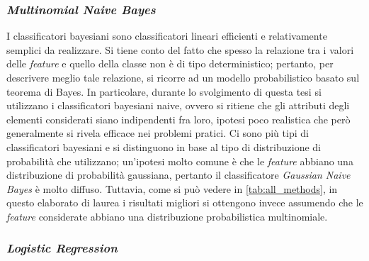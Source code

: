 \documentclass[12pt,a4paper,oneside]{article}
\begin{document}
\subsubsection*{\textit{Multinomial Naive Bayes}}

I classificatori bayesiani \cite{BAYESIAN} sono classificatori lineari efficienti e relativamente semplici da realizzare. Si tiene conto del fatto che spesso la relazione tra i valori delle \textit{feature} e quello della classe non è di tipo deterministico; pertanto, per descrivere meglio tale relazione, si ricorre ad un modello probabilistico basato sul teorema di Bayes. In particolare, durante lo svolgimento di questa tesi si utilizzano i classificatori bayesiani naive, ovvero si ritiene che gli attributi degli elementi considerati siano indipendenti fra loro, ipotesi poco realistica che però generalmente si rivela efficace nei problemi pratici. Ci sono più tipi di classificatori bayesiani e si distinguono in base al tipo di distribuzione di probabilità che utilizzano; un'ipotesi molto comune è che le \textit{feature} abbiano una distribuzione di probabilità gaussiana, pertanto il classificatore \textit{Gaussian Naive Bayes} è molto diffuso. Tuttavia, come si può vedere in \cref{tab:all_methods}, in questo elaborato di laurea i risultati migliori si ottengono invece assumendo che le \textit{feature} considerate abbiano una distribuzione probabilistica multinomiale.



\subsubsection*{\textit{Logistic Regression}}
\end{document}
